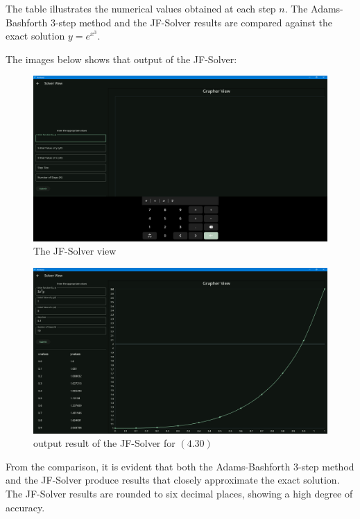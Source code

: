 The table illustrates the numerical values obtained at each step $n$. The Adams-Bashforth 3-step method and the JF-Solver results are compared against the exact solution $y = e^{x^3}$.

The images below shows that output of the JF-Solver:

\begin{figure}[htbp]
    \centering
    \includegraphics[width=1\textwidth]{chapters/4/image/solver_3.png}
    \caption{The JF-Solver view}
\end{figure}

\begin{figure}[htbp]
    \centering
    \includegraphics[width=1\textwidth]{chapters/4/image/solver_2.png}
    \caption{output result of the JF-Solver for $(4.30)$ }
\end{figure}


\newpage
From the comparison, it is evident that both the Adams-Bashforth 3-step method and the JF-Solver produce results that closely approximate the exact solution. The JF-Solver results are rounded to six decimal places, showing a high degree of accuracy.

